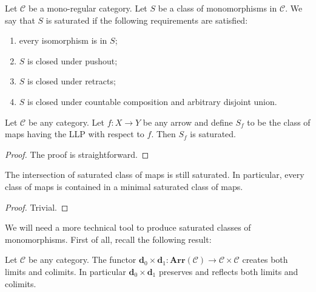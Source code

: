 \begin{refsection}
\begin{defin} \label{defin saturation}
Let $\mathcal C$ be a mono-regular category. Let $S$ be a class of monomorphisms in $\mathcal C$. We say that $S$ is saturated if the following requirements are satisfied:
\begin{enumerate}
\item every isomorphism is in $S$;
\item $S$ is closed under pushout;
\item $S$ is closed under retracts;
\item $S$ is closed under countable composition and arbitrary disjoint union.
\end{enumerate}
\end{defin}

\begin{lemma} \label{lemma llp saturation}
Let $\mathcal C$ be any category. Let $f \colon X \to Y$ be any arrow and define $S_f$ to be the class of maps having the LLP with respect to $f$. Then $S_f$ is saturated.
\end{lemma}

\begin{proof}
The proof is straightforward.
\end{proof}

\begin{lemma} \label{lemma intersection saturated classes}
The intersection of saturated class of maps is still saturated. In particular, every class of maps is contained in a minimal saturated class of maps.
\end{lemma}

\begin{proof}
Trivial.
\end{proof}

We will need a more technical tool to produce saturated classes of monomorphisms. First of all, recall the following result:

\begin{lemma} \label{lemma src tgt creates}
Let $\mathcal C$ be any category. The functor $\mathbf d_0 \times \mathbf d_1 \colon \mathbf{Arr}(\mathcal C) \to \mathcal C \times \mathcal C$ creates both limits and colimits. In particular $\mathbf d_0 \times \mathbf d_1$ preserves and reflects both limits and colimits.
\end{lemma}


\end{refsection}
